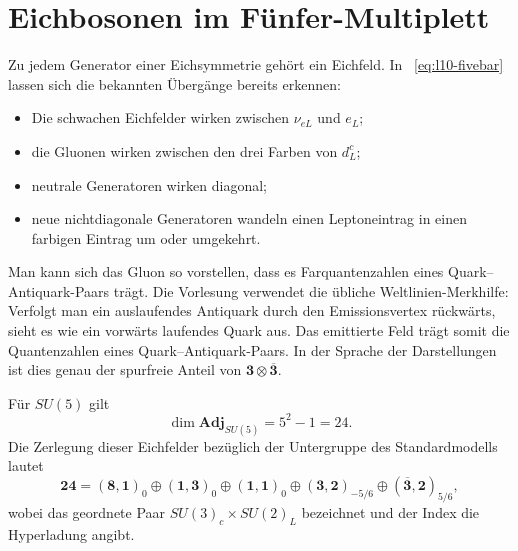 \begin{classroomqa}
\end{classroomqa}

\section{Eichbosonen im Fünfer-Multiplett}

Zu jedem Generator einer Eichsymmetrie gehört ein Eichfeld. In ~\eqref{eq:l10-fivebar} lassen sich die bekannten Übergänge bereits erkennen:
\begin{itemize}
\item Die schwachen Eichfelder wirken zwischen \(\nu_{eL}\) und \(e_L\);
\item die Gluonen wirken zwischen den drei Farben von \(d^c_L\);
\item neutrale Generatoren wirken diagonal;
\item neue nichtdiagonale Generatoren wandeln einen Leptoneintrag in einen farbigen Eintrag um oder umgekehrt.
\end{itemize}

Man kann sich das Gluon so vorstellen, dass es Farquantenzahlen eines Quark--Antiquark-Paars trägt. Die Vorlesung verwendet die übliche Weltlinien-Merkhilfe: Verfolgt man ein auslaufendes Antiquark durch den Emissionsvertex rückwärts, sieht es wie ein vorwärts laufendes Quark aus. Das emittierte Feld trägt somit die Quantenzahlen eines Quark--Antiquark-Paars. In der Sprache der Darstellungen ist dies genau der spurfreie Anteil von \(\mathbf3\otimes\overline{\mathbf3}\).

Für \(SU(5)\) gilt
\begin{equation}
\dim\mathbf{Adj}_{SU(5)}=5^2-1=24.
\end{equation}
Die Zerlegung dieser Eichfelder bezüglich der Untergruppe des Standardmodells lautet
\begin{equation}
\mathbf{24}
=
(\mathbf8,\mathbf1)_0
\oplus(\mathbf1,\mathbf3)_0
\oplus(\mathbf1,\mathbf1)_0
\oplus(\mathbf3,\mathbf2)_{-5/6}
\oplus(\overline{\mathbf3},\mathbf2)_{5/6},
\label{eq:l10-adjoint-sm}
\end{equation}
wobei das geordnete Paar \(SU(3)_c\times SU(2)_L\) bezeichnet und der Index die Hyperladung angibt.

